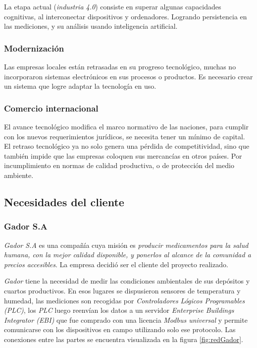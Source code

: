 			La etapa actual (\emph{industria 4.0}) consiste en superar algunas capacidades cognitivas, al interconectar dispositivos y ordenadores. Logrando persistencia en las mediciones, y su análisis usando inteligencia artificial.
	
		\subsubsection{Modernización}

			Las empresas locales están retrasadas en su progreso tecnológico, muchas no incorporaron sistemas electrónicos en sus procesos o productos. Es necesario crear un sistema que logre adaptar la tecnología en uso.

		\subsubsection{Comercio internacional}
			
			El avance tecnológico modifica el marco normativo de las naciones, para cumplir con los nuevos requerimientos jurídicos, se necesita tener un mínimo de capital. El retraso tecnológico ya no solo genera una pérdida de competitividad, sino que también impide que las empresas coloquen sus mercancías en otros países. Por incumplimiento en normas de calidad productiva, o de protección del medio ambiente.

	\subsection{Necesidades del cliente}
		
		\subsubsection{Gador S.A}
		
			\emph{Gador S.A} es una compañía cuya misión es \emph{producir medicamentos para la salud humana, con la mejor calidad disponible, y ponerlos al alcance de la comunidad a precios accesibles}. La empresa decidió ser el cliente del proyecto realizado.
			
			\emph{Gador} tiene la necesidad de medir las condiciones ambientales de sus depósitos y cuartos productivos. En esos lugares se dispusieron sensores de temperatura y humedad, las mediciones son recogidas por \emph{Controladores Lógicos Programables (PLC)}, los \emph{PLC} luego reenvían los datos a un servidor \emph{Enterprise Buildings Integrator (EBI)} que fue comprado con una licencia \emph{Modbus universal} y permite comunicarse con los dispositivos en campo utilizando solo ese protocolo. Las conexiones entre las partes se encuentra visualizada en la figura \ref{fig:redGador}.
			
